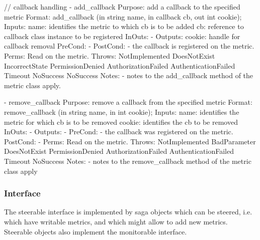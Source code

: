 \begin{myspec}
 
    // callback handling
    - add_callback
      Purpose:  add a callback to the specified metric
      Format:   add_callback       (in  string      name,
                                    in  callback    cb,
                                    out int         cookie);
      Inputs:   name:               identifies the metric to 
                                    which cb
                                    is to be added
                cb:                 reference to callback class
                                    instance to be registered
      InOuts:   -
      Outputs:  cookie:             handle for callback removal
      PreCond:  -
      PostCond: - the callback is registered on the metric.
      Perms:    Read on the metric.
      Throws:   NotImplemented
                DoesNotExist
                IncorrectState
                PermissionDenied
                AuthorizationFailed
                AuthenticationFailed
                Timeout
                NoSuccess
                NoSuccess
      Notes:    - notes to the add_callback method of the metric
                  class apply.
 
 
    - remove_callback
      Purpose:  remove a callback from the specified metric
      Format:   remove_callback    (in  string  name,
                                    in  int     cookie);
      Inputs:   name:               identifies the metric for 
                                    which cb is to be removed
                cookie:             identifies the cb to be
                                    removed
      InOuts:   -
      Outputs:  -
      PreCond:  - the callback was registered on the metric.
      PostCond: - 
      Perms:    Read on the metric.
      Throws:   NotImplemented
                BadParameter
                DoesNotExist
                PermissionDenied
                AuthorizationFailed
                AuthenticationFailed
                Timeout
                NoSuccess
      Notes:    - notes to the remove_callback method of the 
                  metric class apply
 \end{myspec}
 
 
  \subsubsection*{Interface }
 
    The steerable interface is implemented by saga objects which
    can be steered, i.e. which have writable metrics, and which
    might allow to add new metrics.  Steerable objects
     also implement the monitorable interface.
 
